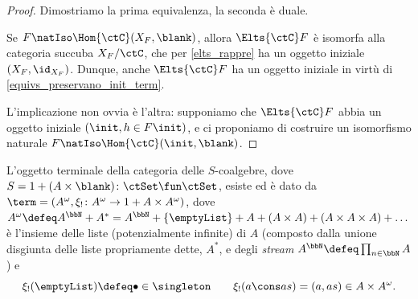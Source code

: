 \begin{proof}
	Dimostriamo la prima equivalenza, la seconda è duale.

	Se \(F\natIso \Hom{\ctC}(X_F,\blank)\), allora \(\Elts{\ctC}F\) è isomorfa alla categoria succuba \(X_F/\ctC\), che per \ref{elts_rappre} ha un oggetto iniziale \((X_F,\id_{X_F})\). Dunque, anche \(\Elts{\ctC}F\) ha un oggetto iniziale in virtù di \ref{equivs_preservano_init_term}.

	L'implicazione non ovvia è l'altra: supponiamo che \(\Elts{\ctC}F\) abbia un oggetto iniziale \((\init,h\in F\init)\), e ci proponiamo di costruire un isomorfismo naturale \(F\natIso \Hom{\ctC}(\init,\blank)\).
\end{proof}
\begin{proposition}\label{term_coalgebra_maybe}
	L'oggetto terminale della categoria delle \(S\)-coalgebre, dove \(S=1+(A\times\blank) \colon \ctSet\fun\ctSet\), esiste ed è dato da \(\term=(A^\omega,\xi_! \colon A^\omega \to 1+A\times A^\omega )\), dove \(A^\omega \defeq  A^\bbN + A^* = A^\bbN + \{\emptyList\} + A + (A \times A) + (A\times A\times A) + \dots\) è l'insieme delle liste (potenzialmente infinite) di \(A\) (composto dalla unione disgiunta delle liste propriamente dette, \(A^*\), e degli \emph{stream} \(A^\bbN \defeq  \prod_{n\in\bbN} A\)) e
	\[\xi_!(\emptyList) \defeq  \bullet \in \singleton \qquad \xi_!(a\cons as) = (a, as) \in A\times A^\omega.\]
\end{proposition}
